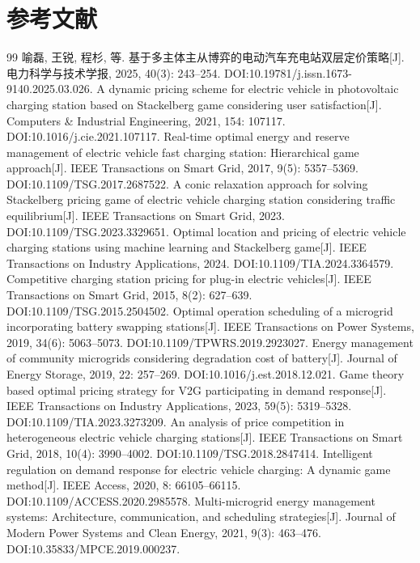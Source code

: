 \documentclass[UTF8,a4paper,11pt]{ctexart}
\begin{document}
\section*{参考文献}
\begin{thebibliography}{99}\small
{} 喻磊, 王锐, 程杉, 等. 基于多主体主从博弈的电动汽车充电站双层定价策略[J]. 电力科学与技术学报, 2025, 40(3): 243--254. DOI:10.19781/j.issn.1673-9140.2025.03.026.
 A dynamic pricing scheme for electric vehicle in photovoltaic charging station based on Stackelberg game considering user satisfaction[J]. Computers \& Industrial Engineering, 2021, 154: 107117. DOI:10.1016/j.cie.2021.107117.
 Real-time optimal energy and reserve management of electric vehicle fast charging station: Hierarchical game approach[J]. IEEE Transactions on Smart Grid, 2017, 9(5): 5357--5369. DOI:10.1109/TSG.2017.2687522.
 A conic relaxation approach for solving Stackelberg pricing game of electric vehicle charging station considering traffic equilibrium[J]. IEEE Transactions on Smart Grid, 2023. DOI:10.1109/TSG.2023.3329651.
 Optimal location and pricing of electric vehicle charging stations using machine learning and Stackelberg game[J]. IEEE Transactions on Industry Applications, 2024. DOI:10.1109/TIA.2024.3364579.
 Competitive charging station pricing for plug-in electric vehicles[J]. IEEE Transactions on Smart Grid, 2015, 8(2): 627--639. DOI:10.1109/TSG.2015.2504502.
 Optimal operation scheduling of a microgrid incorporating battery swapping stations[J]. IEEE Transactions on Power Systems, 2019, 34(6): 5063--5073. DOI:10.1109/TPWRS.2019.2923027.
 Energy management of community microgrids considering degradation cost of battery[J]. Journal of Energy Storage, 2019, 22: 257--269. DOI:10.1016/j.est.2018.12.021.
 Game theory based optimal pricing strategy for V2G participating in demand response[J]. IEEE Transactions on Industry Applications, 2023, 59(5): 5319--5328. DOI:10.1109/TIA.2023.3273209.
 An analysis of price competition in heterogeneous electric vehicle charging stations[J]. IEEE Transactions on Smart Grid, 2018, 10(4): 3990--4002. DOI:10.1109/TSG.2018.2847414.
 Intelligent regulation on demand response for electric vehicle charging: A dynamic game method[J]. IEEE Access, 2020, 8: 66105--66115. DOI:10.1109/ACCESS.2020.2985578.
 Multi-microgrid energy management systems: Architecture, communication, and scheduling strategies[J]. Journal of Modern Power Systems and Clean Energy, 2021, 9(3): 463--476. DOI:10.35833/MPCE.2019.000237.

\end{thebibliography}
\end{document}
